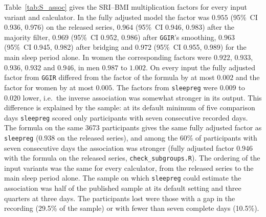 \documentclass[12pt]{article}
\newcommand{\CI}[2]{(95\%\ CI #1, #2)}
\begin{document}
Table~\ref{tab:S_assoc} gives the SRI--BMI multiplication factors for every input variant and calculator. In the fully adjusted model the factor was $0.955$ \CI{0.936}{0.976} on the released series, $0.964$ \CI{0.946}{0.983} after the majority filter, $0.969$ \CI{0.952}{0.986} after \texttt{GGIR}'s smoothing, $0.963$ \CI{0.945}{0.982} after bridging and $0.972$ \CI{0.955}{0.989} for the main sleep period alone. In women the corresponding factors were $0.922$, $0.933$, $0.936$, $0.932$ and $0.946$, in men $0.987$ to $1.002$. On every input the fully adjusted factor from \texttt{GGIR} differed from the factor of the formula by at most $0.002$ and the factor for women by at most $0.005$. The factors from \texttt{sleepreg} were $0.009$ to $0.020$ lower, i.e.\ the inverse association was somewhat stronger in its output. This difference is explained by the sample: at its default minimum of five comparison days \texttt{sleepreg} scored only participants with seven consecutive recorded days. The formula on the same 3673 participants gives the same fully adjusted factor as \texttt{sleepreg} ($0.938$ on the released series), and among the 60\% of participants with seven consecutive days the association was stronger (fully adjusted factor $0.946$ with the formula on the released series, \texttt{check\_subgroups.R}). The ordering of the input variants was the same for every calculator, from the released series to the main sleep period alone. The sample on which \texttt{sleepreg} could estimate the association was half of the published sample at its default setting and three quarters at three days. The participants lost were those with a gap in the recording (29.5\% of the sample) or with fewer than seven complete days (10.5\%).
\end{document}

